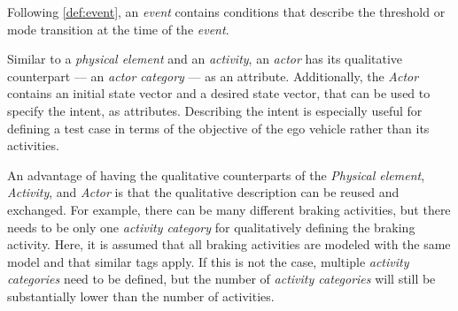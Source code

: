 Following \cref{def:event}, an \textit{event} contains conditions that describe the threshold or mode transition at the time of the \textit{event}.

Similar to a \textit{physical element} and an \textit{activity}, an \textit{actor} has its qualitative counterpart --- an \textit{actor category} --- as an attribute. Additionally, the \textit{Actor} contains an initial state vector and a desired state vector, that can be used to specify the intent, as attributes.
\cendb Describing the intent is especially useful for defining a test case in terms of the objective of the ego vehicle rather than its activities. \cendb


An advantage of having the qualitative counterparts of the \cstarte \textit{Physical element}\cende, \textit{Activity}, and \textit{Actor} is that the qualitative description can be reused and exchanged. For example, there can be many different braking activities, but there needs to be only one \textit{activity category} for qualitatively defining the braking activity. Here, it is assumed that all braking activities are modeled with the same model and that similar tags apply. If this is not the case, multiple \textit{activity categories} need to be defined, but the number of \textit{activity categories} will still be substantially lower than the number of activities.

